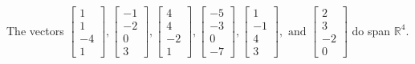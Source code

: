 \begin{exercise}
\begin{exerciseStatement}
  \end{exerciseStatement}
  \begin{exerciseAnswer}
   The vectors \(\left[\begin{array}{r}
1 \\
1 \\
-4 \\
1
\end{array}\right] , \left[\begin{array}{r}
-1 \\
-2 \\
0 \\
3
\end{array}\right] , \left[\begin{array}{r}
4 \\
4 \\
-2 \\
1
\end{array}\right] , \left[\begin{array}{r}
-5 \\
-3 \\
0 \\
-7
\end{array}\right] , \left[\begin{array}{r}
1 \\
-1 \\
4 \\
3
\end{array}\right] , \text{ and } \left[\begin{array}{r}
2 \\
3 \\
-2 \\
0
\end{array}\right]\) 
  	 do  
	span \(\mathbb{R}^4\).
  


  \end{exerciseAnswer}
\end{exercise}